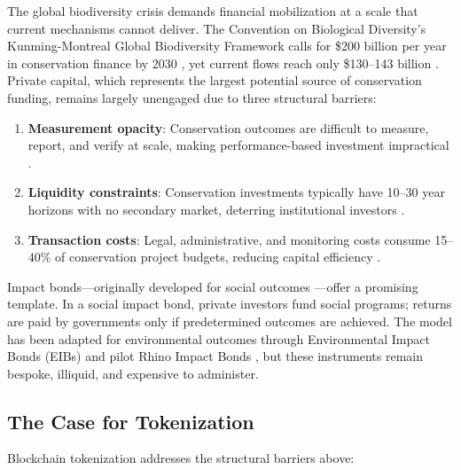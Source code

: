 \documentclass[11pt,a4paper]{article}
\begin{document}
The global biodiversity crisis demands financial mobilization at a scale
that current mechanisms cannot deliver. The Convention on Biological
Diversity's Kunming-Montreal Global Biodiversity Framework calls for
\$200 billion per year in conservation finance by 2030
\citep{cbd2022kunming}, yet current flows reach only \$130--143 billion
\citep{paulson2020financing}. Private capital, which represents the
largest potential source of conservation funding, remains largely
unengaged due to three structural barriers:

\begin{enumerate}[label=(\roman*)]
  \item \textbf{Measurement opacity}: Conservation outcomes are
    difficult to measure, report, and verify at scale, making
    performance-based investment impractical \citep{zu2022biodiversity}.
  \item \textbf{Liquidity constraints}: Conservation investments
    typically have 10--30 year horizons with no secondary market,
    deterring institutional investors \citep{huwyler2014making}.
  \item \textbf{Transaction costs}: Legal, administrative, and
    monitoring costs consume 15--40\% of conservation project budgets,
    reducing capital efficiency \citep{deutz2020financing}.
\end{enumerate}

Impact bonds---originally developed for social outcomes
\citep{liebman2011social}---offer a promising template. In a social
impact bond, private investors fund social programs; returns are paid by
governments only if predetermined outcomes are achieved. The model has
been adapted for environmental outcomes through Environmental Impact
Bonds (EIBs) \citep{nicola2013quantifying} and pilot Rhino Impact Bonds
\citep{uct2020rhino}, but these instruments remain bespoke, illiquid,
and expensive to administer.

\subsection{The Case for Tokenization}

Blockchain tokenization addresses the structural barriers above:
\end{document}
